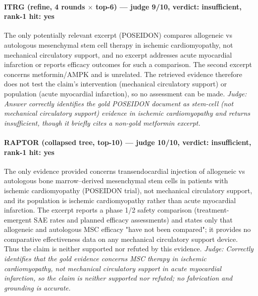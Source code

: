\documentclass[sigconf, review, anonymous]{acmart}
\begin{document}
\paragraph{ITRG (refine, 4 rounds $\times$ top-6) --- judge 9/10, verdict: insufficient, rank-1 hit: yes}
\noindent The only potentially relevant excerpt (POSEIDON) compares allogeneic vs autologous mesenchymal stem cell therapy in ischemic cardiomyopathy, not mechanical circulatory support, and no excerpt addresses acute myocardial infarction or reports efficacy outcomes for such a comparison. The second excerpt concerns metformin/AMPK and is unrelated. The retrieved evidence therefore does not test the claim's intervention (mechanical circulatory support) or population (acute myocardial infarction), so no assessment can be made.
\noindent\small\textit{Judge: Answer correctly identifies the gold POSEIDON document as stem-cell (not mechanical circulatory support) evidence in ischemic cardiomyopathy and returns insufficient, though it briefly cites a non-gold metformin excerpt.}
\paragraph{RAPTOR (collapsed tree, top-10) --- judge 10/10, verdict: insufficient, rank-1 hit: yes}
\noindent The only evidence provided concerns transendocardial injection of allogeneic vs autologous bone marrow--derived mesenchymal stem cells in patients with ischemic cardiomyopathy (POSEIDON trial), not mechanical circulatory support, and its population is ischemic cardiomyopathy rather than acute myocardial infarction. The excerpt reports a phase 1/2 safety comparison (treatment-emergent SAE rates and planned efficacy assessments) and states only that allogeneic and autologous MSC efficacy "have not been compared"; it provides no comparative effectiveness data on any mechanical circulatory support device. Thus the claim is neither supported nor refuted by this evidence.
\noindent\small\textit{Judge: Correctly identifies that the gold evidence concerns MSC therapy in ischemic cardiomyopathy, not mechanical circulatory support in acute myocardial infarction, so the claim is neither supported nor refuted; no fabrication and grounding is accurate.}
\end{document}
